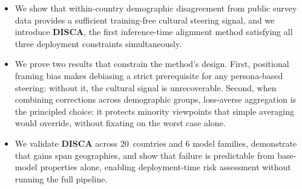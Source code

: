 \documentclass{article}
\begin{document}
\begin{itemize}
    \item We show that within-country demographic disagreement from public survey data provides a sufficient training-free cultural steering signal, and we introduce \textbf{DISCA}, the first inference-time alignment method satisfying all three deployment constraints simultaneously.
    \item We prove two results that constrain the method's design. First, positional framing bias makes debiasing a strict prerequisite for any persona-based steering: without it, the cultural signal is unrecoverable. Second, when combining corrections across demographic groups, loss-averse aggregation is the principled choice: it protects minority viewpoints that simple averaging would override, without fixating on the worst case alone.
    \item We validate \textbf{DISCA} across 20~countries and 6 model families, demonstrate that gains span geographies, and show that failure is predictable from base-model properties alone, enabling deployment-time risk assessment without running the full pipeline.

\end{itemize}

\end{document}
